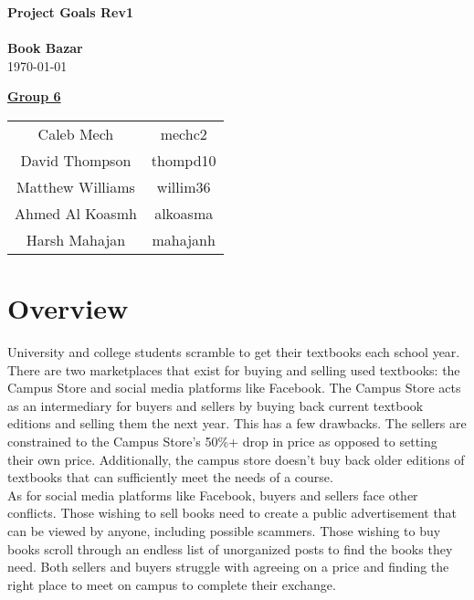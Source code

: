 \documentclass[fullpage]{article}
\begin{document}
\vspace*{\fill}
\begin{center}

  {\Huge \textbf{Project Goals Rev1}}\\
\hrulefill\\[2mm]
  {\huge \textbf{Book Bazar}}\\[2mm]
{\large \today}\\[15mm]
{\large
\underline{\textbf{Group 6}}\\
\begin{tabular}{ c c }

 Caleb Mech & mechc2\\ 
 David Thompson & thompd10\\
 Matthew Williams & willim36\\
 Ahmed Al Koasmh & alkoasma\\
 Harsh Mahajan	& mahajanh    
\end{tabular}
}

\end{center}

\vspace*{\fill}

\newpage

\section{Overview}
University and college students scramble to get their textbooks each school year. There are two marketplaces that exist for buying and selling used textbooks: the Campus Store and social media platforms like Facebook. The Campus Store acts as an intermediary for buyers and sellers by buying back current textbook editions and selling them the next year. This has a few drawbacks. The sellers are constrained to the Campus Store’s 50\%+ drop in price as opposed to setting their own price. Additionally, the campus store doesn't buy back older editions of textbooks that can sufficiently meet the needs of a course.\\

As for social media platforms like Facebook, buyers and sellers face other conflicts. Those wishing to sell books need to create a public advertisement that can be viewed by anyone, including possible scammers. Those wishing to buy books scroll through an endless list of unorganized posts to find the books they need. Both sellers and buyers struggle with agreeing on a price and finding the right place to meet on campus to complete their exchange.\\
\end{document}

